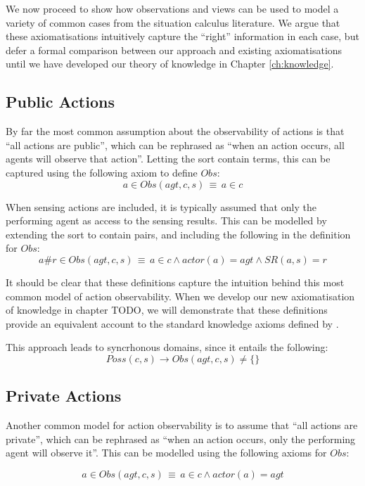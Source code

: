 We now proceed to show how observations and views can be used to model
a variety of common cases from the situation calculus literature.
We argue that these axiomatisations intuitively capture the {}``right''
information in each case, but defer a formal comparison between our
approach and existing axiomatisations until we have developed our
theory of knowledge in Chapter \ref{ch:knowledge}.


\subsection{Public Actions}

By far the most common assumption about the observability of actions
is that {}``all actions are public'', which can be rephrased as
{}``when an action occurs, all agents will observe that action''.
Letting the sort contain terms, this
can be captured using the following axiom to define $Obs$:\[
a\in Obs(agt,c,s)\,\equiv\, a\in c\]


When sensing actions are included, it is typically assumed that only
the performing agent as access to the sensing results. This can be
modelled by extending the  sort to contain 
pairs, and including the following in the definition for $Obs$:\[
a\#r\in Obs(agt,c,s)\,\equiv\, a\in c\wedge actor(a)=agt\wedge SR(a,s)=r\]


It should be clear that these definitions capture the intuition behind
this most common model of action observability. When we develop our
new axiomatisation of knowledge in chapter TODO, we will demonstrate
that these definitions provide an equivalent account to the standard
knowledge axioms defined by \citet{scherl03sc_knowledge}.

This approach leads to syncrhonous domains, since it entails the following:\[
Poss(c,s)\rightarrow Obs(agt,c,s)\neq\{\}\]



\subsection{Private Actions}

Another common model for action observability is to assume that {}``all
actions are private'', which can be rephrased as {}``when an action
occurs, only the performing agent will observe it''. This can be
modelled using the following axioms for $Obs$:

\[
a\in Obs(agt,c,s)\,\equiv\, a\in c\wedge actor(a)=agt\]


